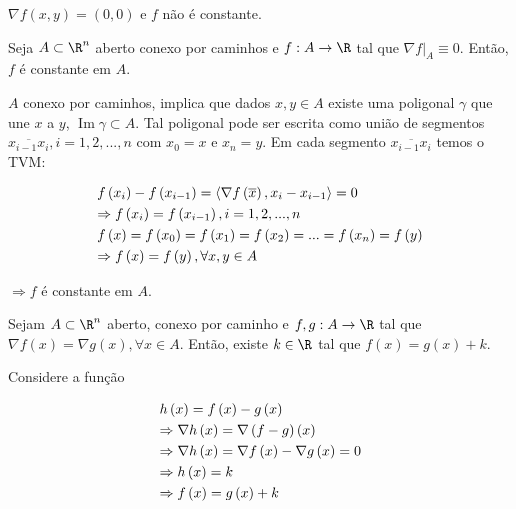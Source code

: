\documentclass[11pt, oneside, a4paper]{gsm-l}
\begin{document}
$\nabla f\left( {x,y} \right) = \left( {0,0} \right)$ e $f$ não é constante.

\begin{teo}
    Seja $A \subset \R^n$ aberto conexo por caminhos e $f:A \to \R$ tal que $\left. {\nabla f} \right|_A  \equiv 0$. Então, $f$ é constante em $A$.
\end{teo}

\begin{dem}
    $A$ conexo por caminhos, implica que dados $x,y \in A$ existe uma poligonal $\gamma$ que une $x$ a $y$, $\operatorname{Im} \gamma  \subset A$. Tal poligonal pode ser escrita como união de segmentos $\overline {x_{i - 1} x_i } ,i = 1,2,...,n$ com $x_0 = x$ e $x_n = y$. Em cada segmento $\overline {x_{i - 1} x_i }$ temos o TVM:

\[
\begin{gathered}
  f\left( {x_i } \right) - f\left( {x_{i - 1} } \right) = \left\langle {\nabla f\left( {\overline x } \right),x_i  - x_{i - 1} } \right\rangle  = 0 \hfill \\
   \Rightarrow f\left( {x_i } \right) = f\left( {x_{i - 1} } \right),i = 1,2,...,n \hfill \\
  f\left( x \right) = f\left( {x_0 } \right) = f\left( {x_1 } \right) = f\left( {x_2 } \right) = ... = f\left( {x_n } \right) = f\left( y \right) \hfill \\
\Rightarrow f\left( x \right) = f\left( y \right),\forall x,y \in A \hfill \\
\end{gathered}
\]

$\Rightarrow f$ é constante em $A$.

\end{dem}

\begin{cor}
    Sejam $A \subset \R^n$ aberto, conexo por caminho e $f,g:A \to \R$ tal que $\nabla f\left( x \right) = \nabla g\left( x \right),\forall x \in A$. Então, existe $k \in \R$ tal que $f(x) = g(x) + k$.
\end{cor}

\begin{dem}
Considere a função

\[
\begin{gathered}
h\left( x \right) = f\left( x \right) - g\left( x \right) \hfill \\
   \Rightarrow \nabla h\left( x \right) = \nabla \left( {f - g} \right)\left( x \right) \hfill \\
   \Rightarrow \nabla h\left( x \right) = \nabla f\left( x \right) - \nabla g\left( x \right) = 0 \hfill \\
\Rightarrow h\left( x \right) = k \hfill \\
\Rightarrow f\left( x \right) = g\left( x \right) + k \hfill \\
\end{gathered}
\]

\end{dem}
\end{document}
